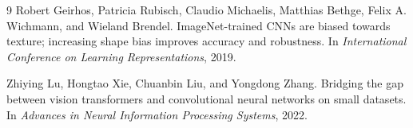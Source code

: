 \documentclass[11pt]{article}
\begin{document}
\begin{thebibliography}{9}
Robert Geirhos, Patricia Rubisch, Claudio Michaelis, Matthias Bethge, Felix A. Wichmann, and Wieland Brendel.
\newblock ImageNet-trained CNNs are biased towards texture; increasing shape bias improves accuracy and robustness.
\newblock In \emph{International Conference on Learning Representations}, 2019.

Zhiying Lu, Hongtao Xie, Chuanbin Liu, and Yongdong Zhang.
\newblock Bridging the gap between vision transformers and convolutional neural networks on small datasets.
\newblock In \emph{Advances in Neural Information Processing Systems}, 2022.

\end{thebibliography}
\end{document}
